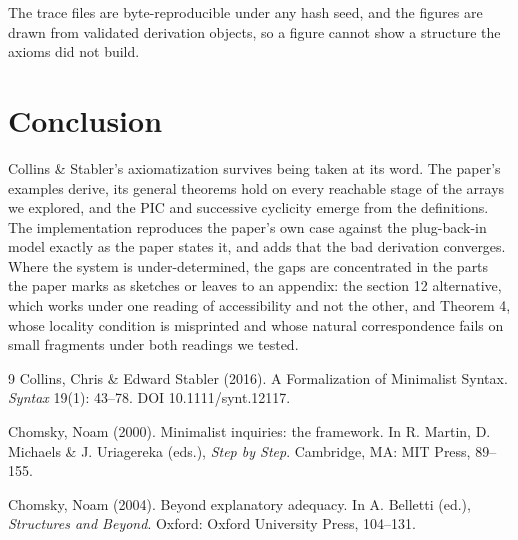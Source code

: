 \documentclass[11pt,a4paper]{article}
\begin{document}
\noindent
The trace files are byte-reproducible under any hash seed, and the figures
are drawn from validated derivation objects, so a figure cannot show a
structure the axioms did not build.

\section{Conclusion}

Collins \& Stabler's axiomatization survives being taken at its word. The
paper's examples derive, its general theorems hold on every reachable stage
of the arrays we explored, and the PIC and successive cyclicity emerge from
the definitions. The implementation reproduces the paper's own case against
the plug-back-in model exactly as the paper states it, and adds that the bad
derivation converges. Where the system is under-determined, the gaps are
concentrated in the parts the paper marks as sketches or leaves to an
appendix: the section 12 alternative, which works under one reading of
accessibility and not the other, and Theorem 4, whose locality condition is
misprinted and whose natural correspondence fails on small fragments under
both readings we tested.

\begin{thebibliography}{9}
Collins, Chris \& Edward Stabler (2016).
A Formalization of Minimalist Syntax.
\textit{Syntax} 19(1): 43--78. DOI 10.1111/synt.12117.

Chomsky, Noam (2000).
Minimalist inquiries: the framework.
In R. Martin, D. Michaels \& J. Uriagereka (eds.),
\textit{Step by Step}. Cambridge, MA: MIT Press, 89--155.

Chomsky, Noam (2004).
Beyond explanatory adequacy.
In A. Belletti (ed.), \textit{Structures and Beyond}.
Oxford: Oxford University Press, 104--131.
\end{thebibliography}
\end{document}
